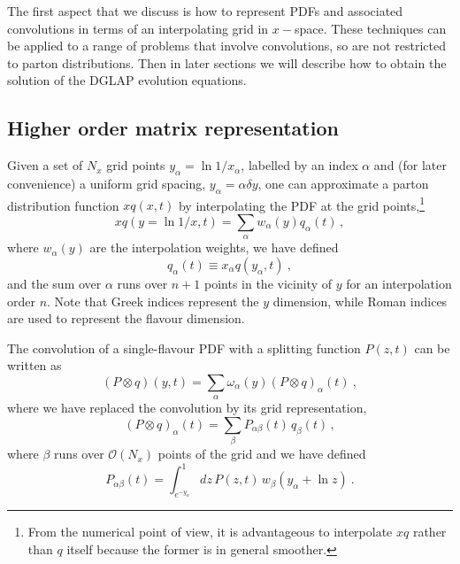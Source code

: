 \documentclass[12pt]{article}
\newcommand{\lp}{\left(}
\newcommand{\rp}{\right)}
\begin{document}
The first aspect that we discuss is how to represent PDFs
and associated convolutions in terms of an interpolating grid
in $x-$space.
These techniques can be applied to a range of problems
that involve convolutions, so are not restricted
to parton distributions. Then in later sections we will describe how
to obtain the solution of the DGLAP evolution equations.

\subsection{Higher order matrix representation}
\label{sec:highord}


Given a set of $N_x$ grid points $y_\alpha=\ln 1/x_{\alpha}$, 
labelled by an
index $\alpha$ and
(for later convenience) a uniform grid spacing, $y_\alpha = \alpha \delta
y$, one can approximate a parton distribution function 
$xq \lp x,t \rp$ by
interpolating the PDF at the grid points,\footnote{From the 
numerical point of view, it is
advantageous to interpolate $xq$ rather than $q$ itself because
the former is in general smoother.}
\begin{equation}
  xq(y=\ln 1/x,t) = \sum_\alpha w_\alpha(y) q_\alpha(t)\,,
\end{equation}
where $w_\alpha(y)$ are the interpolation weights, 
we have defined
\begin{equation}
 q_{\alpha}(t) \equiv
x_{\alpha}q(y_\alpha,t) \ ,
\end{equation}
and the sum over $\alpha$ runs over $n+1$ points in the
vicinity of $y$ for an interpolation order $n$. Note that Greek
indices represent the $y$ dimension, while  Roman indices
are  used to represent the flavour dimension.


The convolution of a single-flavour PDF with a splitting function
$P(z,t)$ can be written as
\begin{equation}
  (P \otimes q)(y,t) = \sum_{\alpha} \omega_{\alpha}(y)
 (P \otimes q)_\alpha(t) \ ,
\end{equation}
where we have replaced the convolution by its grid representation,
\begin{equation}
  (P \otimes q)_\alpha(t) = \sum_{\beta} P_{\alpha\beta}(t) \, q_\beta(t)\,,
\end{equation}
where $\beta$ runs over $\mathcal{O}\lp N_x \rp$ points of the grid and we have
defined
\begin{equation}
  \label{eq:Palphabeta}
  P_{\alpha\beta}(t) = \int_{e^{-y_{\alpha}}}^1 dz
 \,P(z,t)\, w_\beta(y_\alpha + \ln z)\  .
\end{equation}
\end{document}
